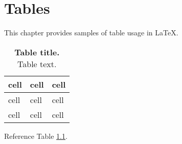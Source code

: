 

\chapter{Tables} \label{tables}

This chapter provides samples of table usage in LaTeX.

\begin{table}[hb] \centering
\caption{\textbf{Table title.} Table text.}
\label{table:1}
\begin{tabular}{ p{2in} p{2in} p{2in} } 
	\toprule
	
	\textbf{cell} & \textbf{cell} & \textbf{cell} \\ 
	
	\midrule
	
	cell & cell & cell \\ 
	
	\midrule
	
	cell & cell & cell \\
	
	\bottomrule
\end{tabular}
\end{table}

Reference Table \ref{table:1}.
